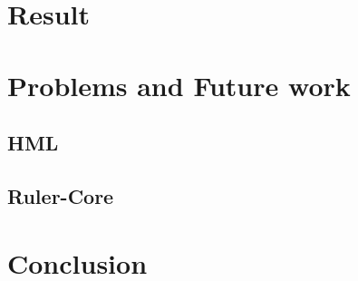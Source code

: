 \frame{
	\frametitle{}

}

\section{Result}

\section{Problems and Future work}

\subsection{HML}

\subsection{Ruler-Core}

\section{Conclusion}
